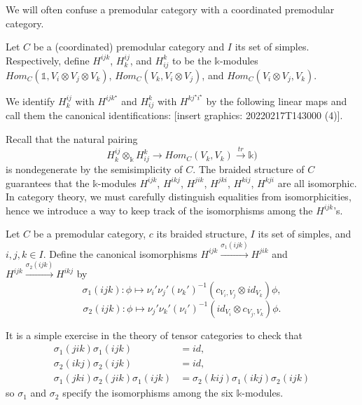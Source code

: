 \noindent We will often confuse a premodular category with a
coordinated premodular category.

\begin{definition}\label{def/multiplicity-module}
  Let $C$ be a (coordinated) premodular category and $I$ its set
  of simples. Respectively, define $H^{ijk}$, $H_{k}^{ij}$, and
  $H_{ij}^{k}$ to be the $\mathbb{k}$-modules
  $Hom_{C}(\mathbb{1}, V_{i} \otimes V_{j} \otimes V_{k})$,
  $Hom_{C}(V_{k}, V_{i} \otimes V_{j})$, and
  $Hom_{C}(V_{i} \otimes V_{j}, V_{k})$.
\end{definition}

\noindent We identify $H_{k}^{ij}$ with $H^{ijk^{\star}}$ and
$H_{ij}^{k}$ with $H^{kj^{\star}i^{\star}}$ by the following
linear maps and call them the canonical identifications: [insert
graphics: 20220217T143000 (4)].

\noindent Recall that the natural pairing
$$H^{ij}_{k} \otimes_{\mathbb{k}} H_{ij}^{k} \to Hom_{C}(V_{k},V_{k}) \xrightarrow{tr} \mathbb{k})$$
is nondegenerate by the semisimplicity of $C$. The braided
structure of $C$ guarantees that the $\mathbb{k}$-modules
$H^{ijk}$, $H^{ikj}$, $H^{jik}$, $H^{jki}$, $H^{kij}$, $H^{kji}$
are all isomorphic. In category theory, we must carefully
distinguish equalities from isomorphicities, hence we introduce a
way to keep track of the isomorphisms among the $H^{ijk}$'s.

\begin{definition}\label{def/canonical-isomorphism}
  Let $C$ be a premodular category, $c$ its braided structure,
  $I$ its set of simples, and $i,j,k \in I$. Define the
  canonical isomorphisms
  $H^{ijk} \xrightarrow{\sigma_{1}(ijk)} H^{jik}$ and
  $H^{ijk} \xrightarrow{\sigma_{2}(ijk)} H^{ikj}$ by
  $$\sigma_{1}(ijk): \phi \mapsto \nu_{i}'\nu_{j}'(\nu_{k}')^{-1}(c_{V_{i}, V_{j}} \otimes id_{V_{k}})\phi,$$
  $$\sigma_{2}(ijk): \phi \mapsto \nu_{j}'\nu_{k}'(\nu_{i}')^{-1}(id_{V_{i}} \otimes c_{V_{j}, V_{k}})\phi.$$
\end{definition}

\noindent It is a simple exercise in the theory of tensor
categories to check that
\begin{equation} \label{eq1}
  \begin{split}
    \sigma_{1}(jik)\sigma_{1}(ijk) & = id, \\
    \sigma_{2}(ikj)\sigma_{2}(ijk) & = id, \\
    \sigma_{1}(jki)\sigma_{2}(jik)\sigma_{1}(ijk) & = \sigma_{2}(kij)\sigma_{1}(ikj)\sigma_{2}(ijk)
  \end{split}
\end{equation}
so $\sigma_{1}$ and $\sigma_{2}$ specify the isomorphisms among
the six $\mathbb{k}$-modules.

